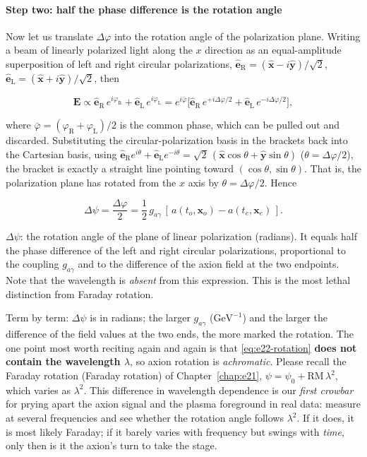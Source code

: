 \paragraph{Step two: half the phase difference is the rotation angle}

Now let us translate \(\Delta\varphi\) into the rotation angle of the polarization plane. Writing a beam of linearly polarized light along the \(x\) direction as an equal-amplitude superposition of left and right circular polarizations, \(\hat{\bm e}_{\mathrm R}=(\hat{\bm x}-i\hat{\bm y})/\sqrt2\), \(\hat{\bm e}_{\mathrm L}=(\hat{\bm x}+i\hat{\bm y})/\sqrt2\), then

\[
  \bm E \propto \hat{\bm e}_{\mathrm R}\,e^{i\varphi_{\mathrm R}}
              +\hat{\bm e}_{\mathrm L}\,e^{i\varphi_{\mathrm L}}
  = e^{i\bar\varphi}\Big[\hat{\bm e}_{\mathrm R}\,e^{+i\Delta\varphi/2}
                        +\hat{\bm e}_{\mathrm L}\,e^{-i\Delta\varphi/2}\Big],
\]

where \(\bar\varphi=(\varphi_{\mathrm R}+\varphi_{\mathrm L})/2\) is the common phase, which can be pulled out and discarded. Substituting the circular-polarization basis in the brackets back into the Cartesian basis, using \(\hat{\bm e}_{\mathrm R}e^{i\theta}+\hat{\bm e}_{\mathrm L}e^{-i\theta}=\sqrt2\,(\hat{\bm x}\cos\theta+\hat{\bm y}\sin\theta)\) (\(\theta=\Delta\varphi/2\)), the bracket is exactly a straight line pointing toward \((\cos\theta,\sin\theta)\). That is, the polarization plane has rotated from the \(x\) axis by \(\theta=\Delta\varphi/2\). Hence

\begin{equation}
  \Delta\psi = \frac{\Delta\varphi}{2}
  = \frac{1}{2}\,g_{a\gamma}\,[\,a(t_o,\bm x_o)-a(t_e,\bm x_e)\,].
  \label{eq:e22-rotation}
\end{equation}
\begin{formulaexplain}
\(\Delta\psi\): the rotation angle of the plane of linear polarization (radians). It equals half the phase difference of the left and right circular polarizations, proportional to the coupling \(g_{a\gamma}\) and to the difference of the axion field at the two endpoints. Note that the wavelength is \emph{absent} from this expression. This is the most lethal distinction from Faraday rotation.
\end{formulaexplain}

Term by term: \(\Delta\psi\) is in radians; the larger \(g_{a\gamma}\) (\(\mathrm{GeV^{-1}}\)) and the larger the difference of the field values at the two ends, the more marked the rotation. The one point most worth reciting again and again is that \eqref{eq:e22-rotation} \textbf{does not contain the wavelength \(\lambda\)}, so axion rotation is \emph{achromatic}. Please recall the Faraday rotation (Faraday rotation) of Chapter~\ref{chap:e21}, \(\psi=\psi_0+\mathrm{RM}\,\lambda^2\), which varies as \(\lambda^2\). This difference in wavelength dependence is our \emph{first crowbar} for prying apart the axion signal and the plasma foreground in real data: measure at several frequencies and see whether the rotation angle follows \(\lambda^2\). If it does, it is most likely Faraday; if it barely varies with frequency but swings with \emph{time}, only then is it the axion's turn to take the stage.


